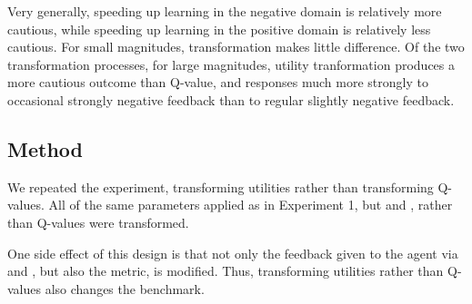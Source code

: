 Very generally, speeding up learning in the negative domain is relatively more cautious, while speeding up learning in the positive domain is relatively less cautious. For small magnitudes, transformation makes little difference. Of the two transformation processes, for large magnitudes, utility tranformation produces a more cautious outcome than Q-value, and responses much more strongly to occasional strongly negative feedback than to regular slightly negative feedback.








\subsection{Method}

We repeated the experiment, transforming utilities rather than transforming Q-values. All of the same parameters applied as in Experiment 1, but \RP{} and \RA{}, rather than Q-values were transformed.

One side effect of this design is that not only the feedback given to the agent via \RP{} and \RA{}, but also the \RStar{} metric, is modified. Thus, transforming utilities rather than Q-values also changes the benchmark.